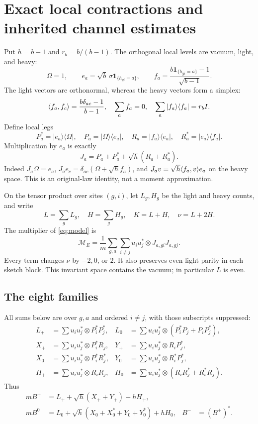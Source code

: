 \documentclass[11pt]{article}
\numberwithin{equation}{section}
\theoremstyle{definition}\newtheorem{definition}[theorem]{Definition}
\theoremstyle{remark}\newtheorem{remark}[theorem]{Remark}
\newcommand{\one}{\mathbf1}\newcommand{\F}{\mathbb F}
\begin{document}
\section{Exact local contractions and inherited channel estimates}
\label{sec:channels}
Put $h=b-1$ and $r_b=b/(b-1)$. The orthogonal local levels are vacuum, light, and heavy:
\[
 \Omega=1,\qquad e_a=\sqrt b\,\sigma\one_{\{h_{gi}=a\}},\qquad
 f_a=\frac{b\one_{\{h_{gi}=a\}}-1}{\sqrt{b-1}}.
\]
The light vectors are orthonormal, whereas the heavy vectors form a simplex:
\begin{equation}
 \langle f_a,f_c\rangle=\frac{b\delta_{ac}-1}{b-1},\quad
 \sum_a f_a=0,\quad \sum_a|f_a\rangle\langle f_a|=r_b I.
 \label{eq:simplex}
\end{equation}
Define local legs
\[
 P_a^*=|e_a\rangle\langle\Omega|,\quad
 P_a=|\Omega\rangle\langle e_a|,\quad
 R_a=|f_a\rangle\langle e_a|,\quad R_a^*=|e_a\rangle\langle f_a|.
\]
Multiplication by $e_a$ is exactly
\begin{equation}
 J_a=P_a+P_a^*+\sqrt h(R_a+R_a^*).
 \label{eq:Jacobi}
\end{equation}
Indeed $J_a\Omega=e_a$, $J_ae_c=\delta_{ac}(\Omega+\sqrt h f_a)$, and $J_av=\sqrt h\langle f_a,v\rangle e_a$ on the heavy space. This is an original-law identity, not a moment approximation.

On the tensor product over sites $(g,i)$, let $L_g,H_g$ be the light and heavy counts, and write
\[
 L=\sum_g L_g,\quad H=\sum_gH_g,\quad K=L+H,\quad \nu=L+2H.
\]
The multiplier of \eqref{eq:model} is
\begin{equation}
 \mathcal M_E=\frac1m\sum_{g,a}\sum_{i\ne j}
       u_i u_j^*\otimes J_{a,gi}J_{a,gj}.
 \label{eq:operator}
\end{equation}
Every term changes $\nu$ by $-2,0$, or $2$. It also preserves even light parity in each sketch block. This invariant space contains the vacuum; in particular $L$ is even.

\subsection{The eight families}
All sums below are over $g,a$ and ordered $i\ne j$, with those subscripts suppressed:
\begin{align}
 L_+&=\sum u_i u_j^*\otimes P_i^*P_j^*, &
 L_0&=\sum u_i u_j^*\otimes(P_i^*P_j+P_iP_j^*),\nonumber\\
 X_+&=\sum u_i u_j^*\otimes P_i^*R_j, &
 Y_+&=\sum u_i u_j^*\otimes R_iP_j^*,\nonumber\\
 X_0&=\sum u_i u_j^*\otimes P_i^*R_j^*, &
 Y_0&=\sum u_i u_j^*\otimes R_i^*P_j^*,\nonumber\\
 H_+&=\sum u_i u_j^*\otimes R_iR_j, &
 H_0&=\sum u_i u_j^*\otimes(R_iR_j^*+R_i^*R_j).
 \label{eq:families}
\end{align}
Thus
\begin{align}
 mB^+&=L_++\sqrt h(X_++Y_+)+hH_+,\nonumber\\
 mB^0&=L_0+\sqrt h(X_0+X_0^*+Y_0+Y_0^*)+hH_0,
 & B^-&=(B^+)^*.
 \label{eq:bands}
\end{align}
\end{document}
